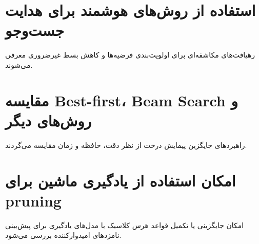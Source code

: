 \section{استفاده از روش‌های هوشمند برای هدایت جست‌وجو}
رهیافت‌های مکاشفه‌ای برای اولویت‌بندی فرضیه‌ها و کاهش بسط غیرضروری معرفی می‌شوند.

\section{مقایسه Best-first، Beam Search و روش‌های دیگر}
راهبردهای جایگزین پیمایش درخت از نظر دقت، حافظه و زمان مقایسه می‌گردند.

\section{امکان استفاده از یادگیری ماشین برای pruning}
امکان جایگزینی یا تکمیل قواعد هرس کلاسیک با مدل‌های یادگیری برای پیش‌بینی نامزدهای امیدوارکننده بررسی می‌شود.
